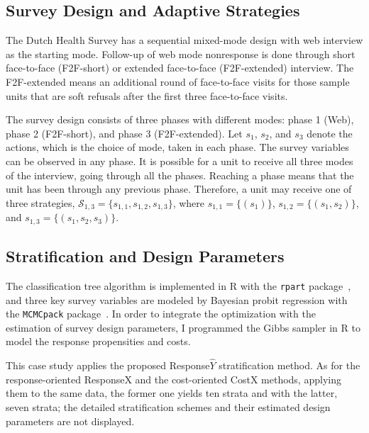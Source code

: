 \documentclass[12pt]{article}
\begin{document}
\subsection{Survey Design and Adaptive Strategies}
\label{subsec:survey-design-adaptive-strategies}

The Dutch Health Survey has a sequential mixed-mode design with web interview as the starting mode.
Follow-up of web mode nonresponse is done through short face-to-face (F2F-short) or extended face-to-face (F2F-extended) interview.
The F2F-extended means an additional round of face-to-face visits for those sample units that are soft refusals after the first three face-to-face visits.

The survey design consists of three phases with different modes: phase 1 (Web), phase 2 (F2F-short), and phase 3 (F2F-extended). Let $s_1$, $s_2$, and $s_3$ denote the actions, which is the choice of mode, taken in each phase.
The survey variables can be observed in any phase.
It is possible for a unit to receive all three modes of the interview, going through all the phases.
Reaching a phase means that the unit has been through any previous phase.
Therefore, a unit may receive one of three strategies, $\mathcal{S}_{1,3}=\{s_{1,1}, s_{1,2}, s_{1,3}\}$, where $s_{1,1}=\{(s_1)\}$, $s_{1,2}=\{(s_1, s_2)\}$, and $s_{1,3}=\{(s_1, s_2, s_3)\}$.


\subsection{Stratification and Design Parameters}
\label{subsec:stratification-design-parameters}

The classification tree algorithm is implemented in \textsf{R} with the \texttt{rpart} package\unskip~\cite{rpart}, and three key survey variables are modeled by Bayesian probit regression with the \texttt{MCMCpack} package\unskip~\cite{MCMCpack}.
In order to integrate the optimization with the estimation of survey design parameters, I programmed the Gibbs sampler in \textsf{R} to model the response propensities and costs.

This case study applies the proposed Response$\hat{Y}$ stratification method.
As for the response-oriented ResponseX and the cost-oriented CostX methods, applying them to the same data, the former one yields ten strata and with the latter, seven strata; the detailed stratification schemes and their estimated design parameters are not displayed.
\end{document}
